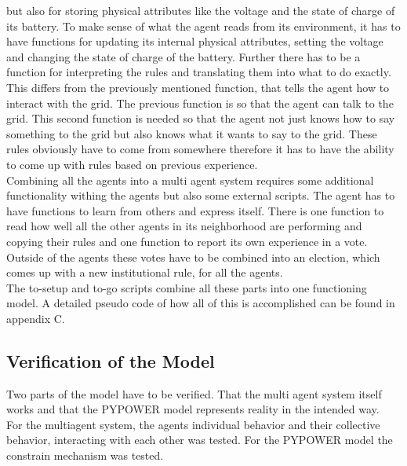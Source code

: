 \documentclass[a4paper]{article}
\begin{document}
but also for storing physical attributes like the voltage and the state of charge of its battery. 
To make sense of what the agent reads from its 
environment, it has to have functions for updating its internal physical attributes, setting the voltage and changing the state of charge of
the battery. Further there has to be a function for interpreting the rules and translating them into what to do exactly. This differs from 
the previously mentioned function, that tells the agent how to interact with the grid. The previous function is so that the agent can talk 
to the grid. This second function is needed so that the agent not just knows how to say something to the grid but also knows what it wants 
to say to the grid. These rules obviously have to come from somewhere therefore it has to have the ability to come up with rules based 
on previous experience. \\
Combining all the agents into a multi agent system requires some additional functionality withing the agents but also some external scripts. 
The agent has to have functions to learn from others and express itself. There is one function to read how well all the other agents in 
its neighborhood are performing and copying their rules and one function to report its own experience in a vote. Outside of the agents 
these votes have to be combined into an election, which comes up with a new institutional rule, for all the agents. \\
The to-setup and to-go scripts combine all these parts into one functioning model. A detailed pseudo code of how all of this is 
accomplished can be found in appendix C. 

\subsection{Verification of the Model}
Two parts of the model have to be verified. That the multi agent system itself works and that the PYPOWER model 
represents reality in the intended way.\\
For the multiagent system, the agents individual behavior and their collective behavior, interacting with each other was 
tested. For the PYPOWER model the constrain mechanism was tested.\\
\end{document}
